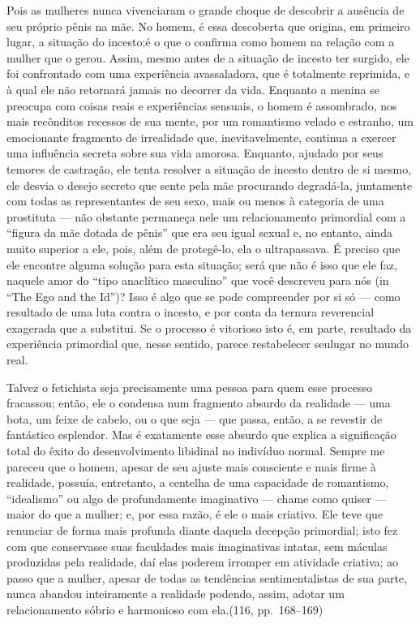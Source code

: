 Pois as mulheres nunca vivenciaram o grande choque de descobrir
a ausência de seu próprio pênis na mãe. No homem, é essa descoberta que
origina, em primeiro lugar, a situação do incesto;\idxinces[|(] é o que o confirma
como homem na relação com a mulher que o gerou. Assim, mesmo antes de a
situação de incesto ter surgido, ele foi confrontado com uma
experiência avassaladora, que é totalmente reprimida, e à qual ele não
retornará jamais no decorrer da vida. Enquanto a menina se preocupa
com coisas reais e experiências sensuais, o homem é assombrado, nos
mais recônditos recessos de sua mente, por um romantismo velado e
estranho, um emocionante fragmento de irrealidade que,
inevitavelmente, continua a exercer uma influência secreta sobre sua
vida amorosa. Enquanto, ajudado por seus temores de castração, ele
tenta resolver a situação de incesto dentro de si mesmo, ele desvia o
desejo secreto que sente pela mãe procurando degradá-la, juntamente
com todas as representantes de seu sexo, mais ou menos à categoria de
uma prostituta --- não obstante permaneça nele um relacionamento
primordial com a ``figura da mãe dotada de
pênis'' que era seu igual sexual e, no entanto, ainda
muito superior a ele, pois, além de protegê-lo, ela o ultrapassava. É
preciso que ele encontre alguma solução para esta situação; será que
não é isso que ele faz, naquele amor do ``tipo anaclítico
masculino'' que você descreveu para nós (in
``The Ego\idxfreudegoid{} and the Id'')? Isso é algo
que se pode compreender por si só --- como resultado de uma luta
contra o incesto, e por conta da ternura reverencial exagerada que a
substitui. Se o processo é vitorioso isto é, em parte, resultado da
experiência primordial que, nesse sentido, parece restabelecer seu\idxinces[|)]
lugar no mundo real.

Talvez o fetichista\idxfetic{} seja precisamente uma pessoa para quem esse
processo fracassou; então, ele o condensa num fragmento absurdo da
realidade --- uma bota, um feixe de cabelo, ou o que seja --- que
passa, então, a se revestir de fantástico esplendor. Mas é exatamente
esse absurdo que explica a significação total do êxito do
desenvolvimento libidinal no indivíduo normal. Sempre me pareceu que o
homem, apesar de seu ajuste mais consciente e mais firme à realidade,
possuía, entretanto, a centelha de uma capacidade de romantismo,
``idealismo'' ou algo de profundamente
imaginativo --- chame como quiser --- maior do que a mulher; e, por
essa razão, é ele o mais criativo.\idxcriavs{} Ele teve que renunciar de forma mais
profunda diante daquela decepção primordial; isto fez com que
conservasse suas faculdades mais imaginativas intatas, sem máculas
produzidas pela realidade, daí elas poderem irromper em atividade
criativa; ao passo que a mulher, apesar de todas as tendências
sentimentalistas de sua parte, nunca abandou inteiramente a realidade
podendo, assim, adotar um relacionamento sóbrio e harmonioso com ela.\idxconfe[|)]
(116, pp.~168--169)\idxsalome[|)]

